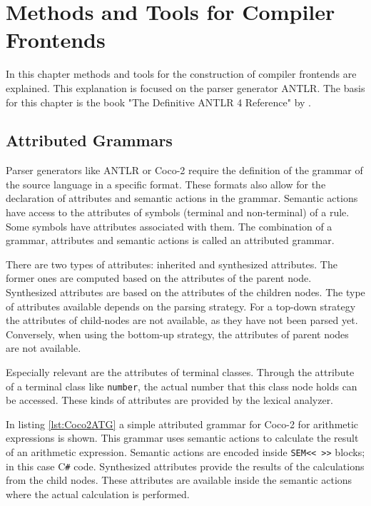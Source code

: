 \chapter{Methods and Tools for Compiler Frontends}

In this chapter  methods and tools for the construction of compiler frontends are explained. This explanation is focused on the parser generator ANTLR. The basis for this chapter is the book "The Definitive ANTLR 4 Reference" by \textcite{Antlr4Reference}.

\section{Attributed Grammars}

Parser generators like ANTLR or Coco-2 require the definition of the grammar of the source language in a specific format. These formats also allow for the declaration of attributes and semantic actions in the grammar. Semantic actions have access to the attributes of symbols (terminal and non-terminal) of a rule. Some symbols have attributes associated with them. The combination of a grammar, attributes and semantic actions is called an attributed grammar.  


There are two types of attributes: inherited and synthesized attributes. The former ones are computed based on the attributes of the parent node. Synthesized attributes are based on the attributes of the children nodes.  
The type of attributes available depends on the parsing strategy. For a top-down strategy the attributes of child-nodes are not available, as they have not been parsed yet. Conversely, when using the bottom-up strategy, the attributes of parent nodes are not available. 

Especially relevant are the attributes of terminal classes. Through the attribute of a terminal class like \texttt{number}, the actual number that this class node holds can be accessed. These kinds of attributes are provided by the lexical analyzer. 

In listing \ref{lst:Coco2ATG} a simple attributed grammar for Coco-2 for arithmetic expressions is shown. This grammar uses semantic actions to calculate the result of an arithmetic expression. Semantic actions are encoded inside \lstinline{SEM<< >>} blocks; in this case C\verb|#| code. Synthesized attributes provide the results of the calculations from the child nodes. These attributes are available inside the semantic actions where the actual calculation is performed. 

